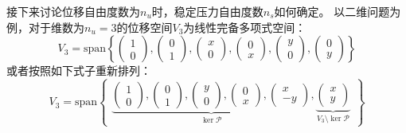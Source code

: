 接下来讨论位移自由度数为$n_u$时，稳定压力自由度数$n_s$如何确定。
以二维问题为例，对于维数为$n_u=3$的位移空间$V_3$为线性完备多项式空间：
\begin{equation}
    V_3 = \mathrm{span} \left \{
    \begin{pmatrix} 1 \\ 0 \end{pmatrix},
    \begin{pmatrix} 0 \\ 1 \end{pmatrix},
    \begin{pmatrix} x \\ 0 \end{pmatrix},
    \begin{pmatrix} 0 \\ x \end{pmatrix},
    \begin{pmatrix} y \\ 0 \end{pmatrix},
    \begin{pmatrix} 0 \\ y \end{pmatrix}
    \right \}
\end{equation}
或者按照如下式子重新排列：
\begin{equation}\label{ch_3:eq:base1}
    V_3 = \mathrm{span} 
    \begin{Bmatrix}
        \underbrace{
        \begin{pmatrix} 1 \\ 0 \end{pmatrix},
        \begin{pmatrix} 0 \\ 1 \end{pmatrix},
        \begin{pmatrix} y \\ 0 \end{pmatrix},
        \begin{pmatrix} 0 \\ x \end{pmatrix},
        \begin{pmatrix} x \\ -y \end{pmatrix}
        }_{\ker \mathcal P},
        \underbrace{
        \begin{pmatrix} x \\ y \end{pmatrix}
        }_{V_3\setminus \ker \mathcal P}
    \end{Bmatrix}
\end{equation}
